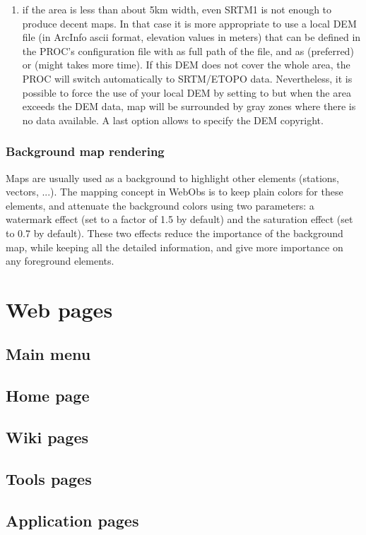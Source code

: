 \begin{enumerate}
\item if the area is less than about 5km width, even SRTM1 is not enough to produce decent maps. In that case it is more appropriate to use a local DEM file (in ArcInfo ascii format, elevation values in meters) that can be defined in the PROC's configuration file with  as full path of the file, and  as  (preferred) or  (might takes more time). If this DEM does not cover the whole area, the PROC will switch automatically to SRTM/ETOPO data. Nevertheless, it is possible to force the use of your local DEM by setting  to  but when the area exceeds the DEM data, map will be surrounded by gray zones where there is no data available. A last option  allows to specify the DEM copyright.

\end{enumerate}


\subsubsection{Background map rendering}

Maps are usually used as a background to highlight other elements (stations, vectors, ...). The mapping concept in WebObs is to keep plain colors for these elements, and attenuate the background colors using two parameters: a watermark effect (set to a factor of 1.5 by default) and the saturation effect (set to 0.7 by default). These two effects reduce the importance of the background map, while keeping all the detailed information, and give more importance on any foreground elements.


\section{Web pages}



\subsection{Main menu}


\subsection{Home page}


\subsection{Wiki pages}


\subsection{Tools pages}


\subsection{Application pages}


